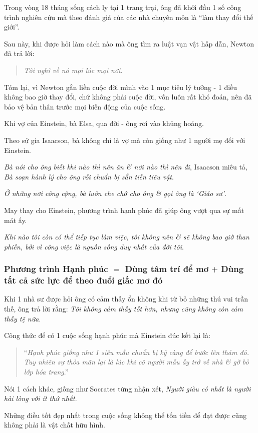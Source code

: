 \documentclass{article}
\begin{document}
Trong vòng 18 tháng sống cách ly tại 1 trang trại, ông đã khởi đầu 1 số công trình nghiên cứu mà theo đánh giá của các nhà chuyên môn là ``làm thay đổi thế giới''.

%
Sau này, khi được hỏi làm cách nào mà ông tìm ra luật vạn vật hấp dẫn, Newton đã trả lời:
\begin{quotation}
	\textit{Tôi nghĩ về nó mọi lúc mọi nơi}.
\end{quotation}
Tóm lại, vì Newton gắn liền cuộc đời mình vào 1 mục tiêu lý tưởng - 1 điều không bao giờ thay đổi, chứ không phải cuộc đời, vốn luôn rất khó đoán, nên đã bảo vệ bản thân trước mọi biến động của cuộc sống.

%
Khi vợ của Einstein, bà Elsa, qua đời - ông rơi vào khủng hoảng.

Theo sử gia Isaacson, bà không chỉ là vợ mà còn giống như 1 người mẹ đối với Einstein.

%
\textit{Bà nói cho ông biết khi nào thì nên ăn \& nơi nào thì nên đi}, Isaacson miêu tả, \textit{Bà soạn hành lý cho ông rồi chuẩn bị sẵn tiền tiêu vặt}.

\textit{Ở những nơi công cộng, bà luôn che chở cho ông \& gọi ông là `Giáo sư'}.

%
May thay cho Einstein, phương trình hạnh phúc đã giúp ông vượt qua sự mất mát ấy.

\textit{Khi nào tôi còn có thể tiếp tục làm việc, tôi không nên \& sẽ không bao giờ than phiền, bởi vì công việc là nguồn sống duy nhất của đời tôi}.

\subsubsection{Phương trình Hạnh phúc $=$ Dùng tâm trí để mơ $+$ Dùng tất cả sức lực để theo đuổi giấc mơ đó}
Khi 1 nhà sư được hỏi ông có cảm thấy ổn không khi từ bỏ những thú vui trần thế, ông trả lời rằng: \textit{Tôi không cảm thấy tốt hơn, nhưng cũng không còn cảm thấy tệ nữa}.

%
Công thức để có 1 cuộc sống hạnh phúc mà Einstein đúc kết lại là:
\begin{quotation}
	``\textit{Hạnh phúc giống như 1 siêu mẫu chuẩn bị kỹ càng để  bước lên thảm đỏ. Tuy nhiên sự thỏa mãn lại là lúc khi cô người mẫu ấy trở về nhà \& gỡ bỏ lớp hóa trang}.''
\end{quotation}
Nói 1 cách khác, giống như Socrates từng nhận xét, \textit{Người giàu có nhất là người hài lòng với ít thứ nhất}.

%
Những điều tốt đẹp nhất trong cuộc sống không thể tốn tiền để đạt được cũng  không phải là vật chất hữu hình.
\end{document}
